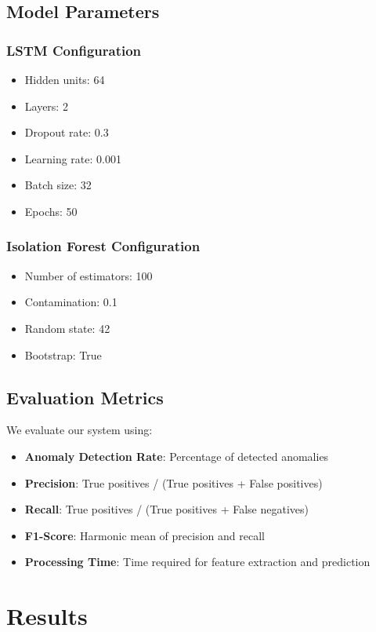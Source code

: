 \documentclass[conference]{IEEEtran}
\begin{document}
\subsection{Model Parameters}
\subsubsection{LSTM Configuration}
\begin{itemize}
    \item Hidden units: 64
    \item Layers: 2
    \item Dropout rate: 0.3
    \item Learning rate: 0.001
    \item Batch size: 32
    \item Epochs: 50
\end{itemize}

\subsubsection{Isolation Forest Configuration}
\begin{itemize}
    \item Number of estimators: 100
    \item Contamination: 0.1
    \item Random state: 42
    \item Bootstrap: True
\end{itemize}

\subsection{Evaluation Metrics}
We evaluate our system using:
\begin{itemize}
    \item \textbf{Anomaly Detection Rate}: Percentage of detected anomalies
    \item \textbf{Precision}: True positives / (True positives + False positives)
    \item \textbf{Recall}: True positives / (True positives + False negatives)
    \item \textbf{F1-Score}: Harmonic mean of precision and recall
    \item \textbf{Processing Time}: Time required for feature extraction and prediction
\end{itemize}

\section{Results}
\end{document}
